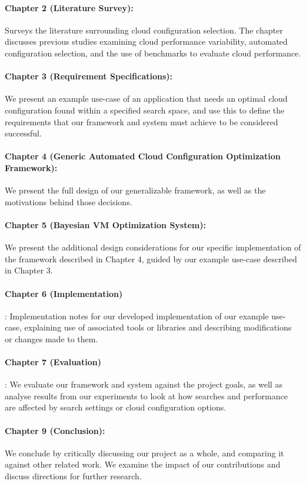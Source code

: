 \documentclass{report}
\begin{document}
\paragraph{Chapter 2 (Literature Survey):} Surveys the literature surrounding cloud configuration selection. The chapter discusses previous studies examining cloud performance variability, automated configuration selection, and the use of benchmarks to evaluate cloud performance.
\paragraph{Chapter 3 (Requirement Specifications):} We present an example use-case of an application that needs an optimal cloud configuration found within a specified search space, and use this to define the requirements that our framework and system must achieve to be considered successful.
\paragraph{Chapter 4 (Generic Automated Cloud Configuration Optimization Framework):} We present the full design of our generalizable framework, as well as the motivations behind those decisions.
\paragraph{Chapter 5 (Bayesian VM Optimization System):} We present the additional design considerations for our specific implementation of the framework described in Chapter 4, guided by our example use-case described in Chapter 3.
\paragraph{Chapter 6 (Implementation)}: Implementation notes for our developed implementation of our example use-case, explaining use of associated tools or libraries and describing modifications or changes made to them.
\paragraph{Chapter 7 (Evaluation)}: We evaluate our framework and system against the project goals, as well as analyse results from our experiments to look at how searches and performance are affected by search settings or cloud configuration options.
\paragraph{Chapter 9 (Conclusion):} We conclude by critically discussing our project as a whole, and comparing it against other related work. We examine the impact of our contributions and discuss directions for further research.
\end{document}
